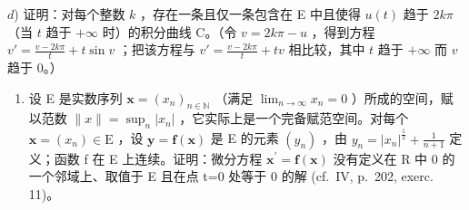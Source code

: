 \(d\)) 证明：对每个整数 \(k\) ，存在一条且仅一条包含在 E 中且使得 \(u(t)\) 趋于 \(2k\pi\) （当 \(t\) 趋于 \(+\infty\) 时）的积分曲线 C。（令 \(v = 2k\pi - u\) ，得到方程 \(v' = \frac{v - 2k\pi}{t} + t \sin v\) ；把该方程与 \(v' = \frac{v - 2k\pi}{t} + tv\) 相比较，其中 \(t\) 趋于 \(+\infty\) 而 \(v\) 趋于 0。）

\begin{enumerate}
\def\labelenumi{\arabic{enumi})}
\setcounter{enumi}{17}
\tightlist
\item
  设 E 是实数序列 \(\mathbf{x}=(x_{n})_{n\in\mathbb{N}}\) （满足 \(\lim_{n\to\infty}x_{n}=0\) ）所成的空间，赋以范数 \(\|x\|=\sup_{n}|x_{n}|\) ，它实际上是一个完备赋范空间。对每个 \(\mathbf{x}=(x_{n})\in\mathrm{E}\) ，设 \(\mathbf{y}=\mathbf{f}(\mathbf{x})\) 是 E 的元素 \((y_{n})\) ，由 \(y_{n}=|x_{n}|^{\frac{1}{2}}+\frac{1}{n+1}\) 定义；函数 f 在 E 上连续。证明：微分方程 \(\mathbf{x}^{\prime}=\mathbf{f}(\mathbf{x})\) 没有定义在 R 中 0 的一个邻域上、取值于 E 且在点 t=0 处等于 0 的解 (cf.~IV, p.~202, exerc. 11)。
\end{enumerate}

\setcounter{exercisegroup}{1}
